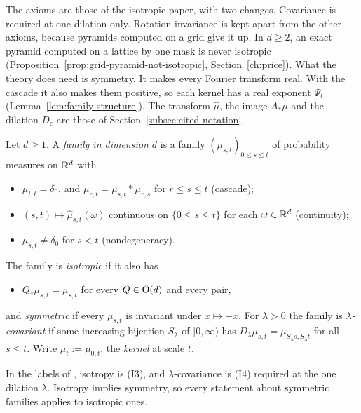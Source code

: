 The axioms are those of the isotropic paper, with two changes. Covariance is required at one
dilation only. Rotation invariance is kept apart from the other axioms, because pyramids computed
on a grid give it up. In $d \ge 2$, an exact pyramid computed on a lattice by one mask is never
isotropic (Proposition~\ref{prop:grid-pyramid-not-isotropic}, Section~\ref{ch:price}). What the
theory does need is symmetry. It makes every Fourier transform real. With the cascade it also makes
them positive, so each kernel has a real exponent $\Psi_t$ (Lemma~\ref{lem:family-structure}). The
transform $\widehat\mu$, the image $A_*\mu$ and the dilation $D_c$ are those of
Section~\ref{subsec:cited-notation}.

\begin{definition}
\label{def:family-dimension-d}

Let $d \ge 1$. A \emph{family in dimension $d$} is a family $(\mu_{s,t})_{0 \le s \le t}$ of
probability measures on $\mathbb{R}^d$ with
\begin{itemize}
\item[(I1)] $\mu_{t,t} = \delta_0$, and $\mu_{r,t} = \mu_{s,t} * \mu_{r,s}$ for $r \le s \le t$
(cascade);
\item[(I2)] $(s,t) \mapsto \widehat\mu_{s,t}(\omega)$ continuous on $\{0 \le s \le t\}$ for each
$\omega \in \mathbb{R}^d$ (continuity);
\item[(ND)] $\mu_{s,t} \ne \delta_0$ for $s < t$ (nondegeneracy).
\end{itemize}
The family is \emph{isotropic} if it also has
\begin{itemize}
\item[(I3)] $Q_*\mu_{s,t} = \mu_{s,t}$ for every $Q \in \mathrm{O}(d)$ and every pair,
\end{itemize}
and \emph{symmetric} if every $\mu_{s,t}$ is invariant under $x \mapsto -x$. For $\lambda > 0$ the
family is \emph{$\lambda$-covariant} if some increasing bijection $S_\lambda$ of $[0,\infty)$ has
$D_\lambda\mu_{s,t} = \mu_{S_\lambda s, S_\lambda t}$ for all $s \le t$. Write
$\mu_t := \mu_{0,t}$, the \emph{kernel} at scale $t$.
\end{definition}

In the labels of , isotropy is (I3), and $\lambda$-covariance is
(I4) required at the one dilation $\lambda$. Isotropy implies symmetry, so every statement about
symmetric families applies to isotropic ones.

